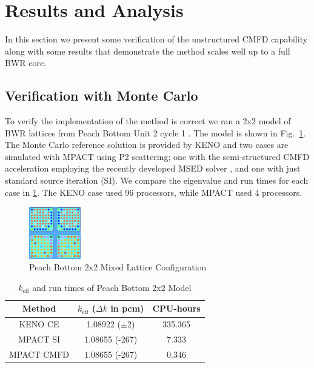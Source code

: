 \documentclass{anstrans}
\newcommand{\figref}[1]{Fig.~\ref{#1}}
\begin{document}
\section{Results and Analysis}
In this section we present some verification of the unstructured CMFD capability along with some results that demonstrate the method scales well up to a full BWR core.

\subsection{Verification with Monte Carlo}
To verify the implementation of the method is correct we ran a 2x2 model of BWR lattices from Peach Bottom Unit 2 cycle 1 \cite{Larsen1978}. The model is shown in \figref{fig:pb2x2}. The Monte Carlo reference solution is provided by KENO \cite{SCALE2009} and two cases are simulated with MPACT using P2 scattering; one with the semi-structured CMFD acceleration employing the recently developed MSED solver \cite{Yee2017}, and one with just standard source iteration (SI). We compare the eigenvalue and run times for each case in \ref{tab:pb2x2}. The KENO case used 96 processors, while MPACT used 4 processors.

\begin{figure}[!ht]
    \centering
    \includegraphics[width=0.2\textwidth]{pb-2x2-cropped.png}
    \caption{Peach Bottom 2x2 Mixed Lattice Configuration}
    \label{fig:pb2x2}
\end{figure}
\begin{table}[!htb]
    \centering
    \renewcommand{\arraystretch}{1.45}
    \caption{$k_{\text{eff}}$ and run times of Peach Bottom 2x2 Model}
    \label{tab:pb2x2}
    \begin{tabular}{@{}ccc@{}}\toprule
      Method        & $k_{\text{eff}}$ ($\Delta k$ in pcm)  & CPU-hours\\\midrule
      KENO CE       & 1.08922 ($\pm$2)  & 335.365\\
      MPACT SI      & 1.08655 (-267)    & 7.333\\
      MPACT CMFD    & 1.08655 (-267)    & 0.346\\\bottomrule
    \end{tabular}
    \vspace{-2mm}
\end{table}
\end{document}
